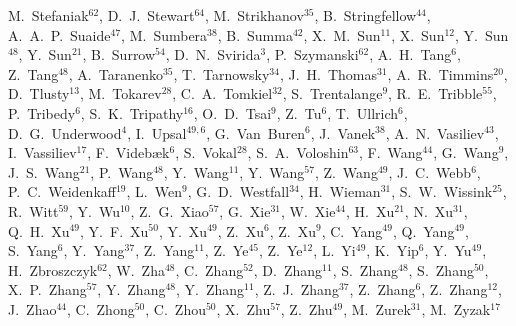 {M.~Stefaniak$^{62}$,
D.~J.~Stewart$^{64}$,
M.~Strikhanov$^{35}$,
B.~Stringfellow$^{44}$,
A.~A.~P.~Suaide$^{47}$,
M.~Sumbera$^{38}$,
B.~Summa$^{42}$,
X.~M.~Sun$^{11}$,
X.~Sun$^{12}$,
Y.~Sun$^{48}$,
Y.~Sun$^{21}$,
B.~Surrow$^{54}$,
D.~N.~Svirida$^{3}$,
P.~Szymanski$^{62}$,
A.~H.~Tang$^{6}$,
Z.~Tang$^{48}$,
A.~Taranenko$^{35}$,
T.~Tarnowsky$^{34}$,
J.~H.~Thomas$^{31}$,
A.~R.~Timmins$^{20}$,
D.~Tlusty$^{13}$,
M.~Tokarev$^{28}$,
C.~A.~Tomkiel$^{32}$,
S.~Trentalange$^{9}$,
R.~E.~Tribble$^{55}$,
P.~Tribedy$^{6}$,
S.~K.~Tripathy$^{16}$,
O.~D.~Tsai$^{9}$,
Z.~Tu$^{6}$,
T.~Ullrich$^{6}$,
D.~G.~Underwood$^{4}$,
I.~Upsal$^{49,6}$,
G.~Van~Buren$^{6}$,
J.~Vanek$^{38}$,
A.~N.~Vasiliev$^{43}$,
I.~Vassiliev$^{17}$,
F.~Videb{\ae}k$^{6}$,
S.~Vokal$^{28}$,
S.~A.~Voloshin$^{63}$,
F.~Wang$^{44}$,
G.~Wang$^{9}$,
J.~S.~Wang$^{21}$,
P.~Wang$^{48}$,
Y.~Wang$^{11}$,
Y.~Wang$^{57}$,
Z.~Wang$^{49}$,
J.~C.~Webb$^{6}$,
P.~C.~Weidenkaff$^{19}$,
L.~Wen$^{9}$,
G.~D.~Westfall$^{34}$,
H.~Wieman$^{31}$,
S.~W.~Wissink$^{25}$,
R.~Witt$^{59}$,
Y.~Wu$^{10}$,
Z.~G.~Xiao$^{57}$,
G.~Xie$^{31}$,
W.~Xie$^{44}$,
H.~Xu$^{21}$,
N.~Xu$^{31}$,
Q.~H.~Xu$^{49}$,
Y.~F.~Xu$^{50}$,
Y.~Xu$^{49}$,
Z.~Xu$^{6}$,
Z.~Xu$^{9}$,
C.~Yang$^{49}$,
Q.~Yang$^{49}$,
S.~Yang$^{6}$,
Y.~Yang$^{37}$,
Z.~Yang$^{11}$,
Z.~Ye$^{45}$,
Z.~Ye$^{12}$,
L.~Yi$^{49}$,
K.~Yip$^{6}$,
Y.~Yu$^{49}$,
H.~Zbroszczyk$^{62}$,
W.~Zha$^{48}$,
C.~Zhang$^{52}$,
D.~Zhang$^{11}$,
S.~Zhang$^{48}$,
S.~Zhang$^{50}$,
X.~P.~Zhang$^{57}$,
Y.~Zhang$^{48}$,
Y.~Zhang$^{11}$,
Z.~J.~Zhang$^{37}$,
Z.~Zhang$^{6}$,
Z.~Zhang$^{12}$,
J.~Zhao$^{44}$,
C.~Zhong$^{50}$,
C.~Zhou$^{50}$,
X.~Zhu$^{57}$,
Z.~Zhu$^{49}$,
M.~Zurek$^{31}$,
M.~Zyzak$^{17}$
}


